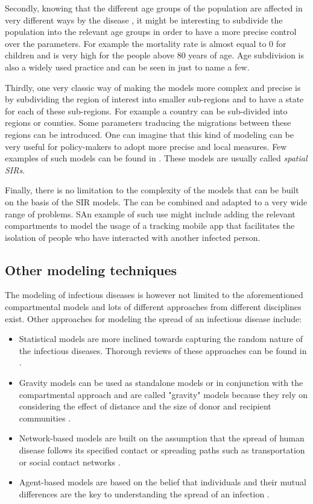 \documentclass[12pt, letterpaper]{article}
\begin{document}
Secondly, knowing that the different age groups of the population are affected in very different ways by the disease \cite{agegroups}, it might be interesting to subdivide the population into the relevant age groups in order to have a more precise control over the parameters. For example the mortality rate is almost equal to 0 for children and is very high for the people above 80 years of age. Age subdivision is also a widely used practice and can be seen in \cite{age} just to name a few.

Thirdly, one very classic way of making the models more complex and precise is by subdividing the region of interest into smaller sub-regions and to have a state for each of these sub-regions. For example a country can be sub-divided into regions or counties. Some parameters traducing the migrations between these regions can be introduced. One can imagine that this kind of modeling can be very useful for policy-makers to adopt more precise and local measures. Few examples of such models can be found in \cite{spatial}. These models are usually called {\em spatial SIRs}. 

Finally, there is no limitation to the complexity of the models that can be built on the basis of the SIR models. The can be combined and adapted to a very wide range of problems. SAn example of such use might include adding the relevant compartments to model the usage of a tracking mobile app that facilitates the isolation of people who have interacted with another infected person.

\subsection{Other modeling techniques}

The modeling of infectious diseases is however not limited to the aforementioned compartmental models and lots of different approaches from different disciplines exist. Other approaches for modeling the spread of an infectious disease include:

\begin{itemize}

\item Statistical models are more inclined towards capturing the random nature of the infectious diseases. Thorough reviews of these approaches can be found in \cite{}.

\item Gravity models can be used as standalone models or in conjunction with the compartmental approach and are called "gravity" models because they rely on considering the effect of distance and the size of donor and recipient communities \cite{}. 

\item Network-based models are built on the assumption that the spread of human disease follows its specified contact or spreading paths such as transportation or social contact networks \cite{}.

\item Agent-based models are based on the belief that individuals and their mutual differences are the key to understanding the spread of an infection \cite{}.
\end{itemize}
\end{document}
